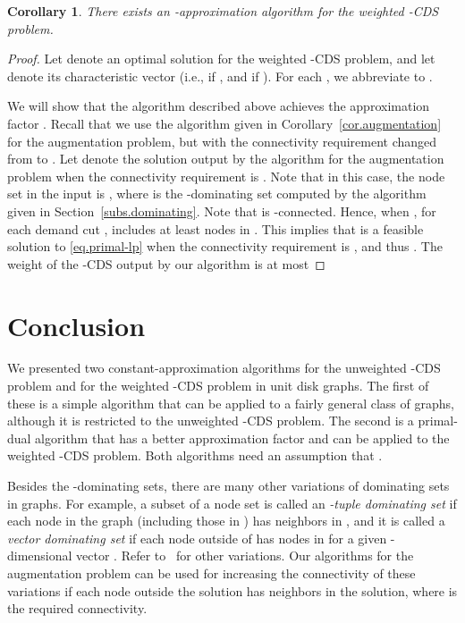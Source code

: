 \documentclass[11pt]{article}
\newtheorem{corollary}{Corollary}
\begin{document}
 \begin{corollary}\label{cor.primal-dual}
  There exists an -approximation algorithm for the
  weighted -CDS problem.
 \end{corollary}
 \begin{proof}
  Let  denote an optimal solution for the weighted -CDS
  problem, and let  denote its characteristic vector
  (i.e.,  if , and  if ).
  For each , we abbreviate  to .

 We will show that the algorithm described above achieves the approximation
  factor .
  Recall that we use the algorithm given in
  Corollary~\ref{cor.augmentation} for the augmentation
  problem, but with the connectivity requirement  changed
  from  to .
  Let  denote the solution output by the algorithm for the
  augmentation problem when the connectivity requirement is .
  Note that in this case, the node set  in the input is , where  is the
  -dominating set computed by the algorithm given in Section~\ref{subs.dominating}.
 Note that  is -connected.
  Hence, when , for each demand cut ,
   includes at least  nodes in .
  This implies that  is a feasible solution to \eqref{eq.primal-lp}
  when the connectivity requirement is ,
  and thus .
  The weight of the -CDS output by our algorithm
is at most

\end{proof}

 


 \section{Conclusion}
 \label{sec.conclusion}

 We presented two constant-approximation algorithms for the
 unweighted -CDS problem
 and for the weighted -CDS problem in unit
 disk graphs.
 The first of these is a simple algorithm that can be applied to a fairly general class of graphs,
 although it is restricted to the unweighted
 -CDS problem.
 The second is a primal-dual algorithm that has a better approximation factor and
 can be applied to the weighted -CDS problem.
 Both algorithms need an assumption that .
 
 
 
 Besides the -dominating sets,
  there are many other variations of dominating sets in graphs. For example,
  a subset  of a node set  is called an \emph{-tuple dominating set}
  if each node in the graph (including those in )
  has  neighbors in ,
  and it is called a \emph{vector dominating set}
  if each node  outside of  has  nodes in 
  for a given -dimensional vector .
  Refer to~\cite{CicaleseMV13} for other variations.
  Our algorithms for the augmentation problem can be used for
  increasing the connectivity of 
  these  variations if each node outside the solution has 
  neighbors
  in the solution, where  is the required connectivity.
  
\end{document}
